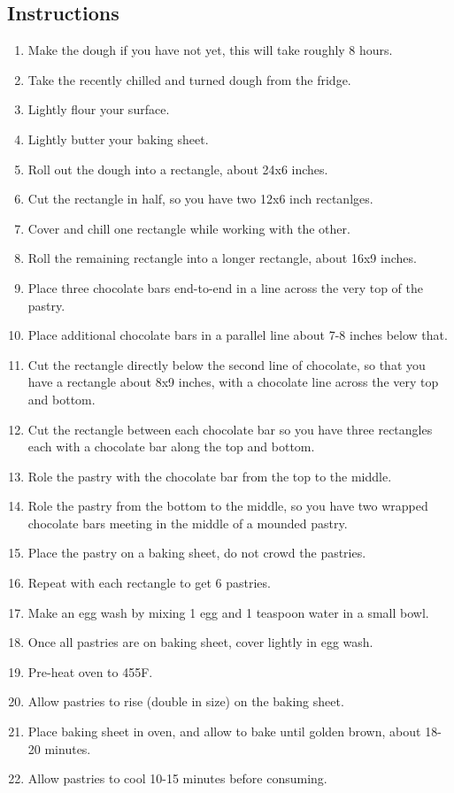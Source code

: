 \begin{multicols}{2}
\subsection*{Instructions}
\begin{enumerate}
    \item Make the  dough if you have not yet, this will take roughly 8 hours.
    \item Take the recently chilled and turned dough from the fridge.
    \item Lightly flour your surface.
    \item Lightly butter your baking sheet.
    \item Roll out the dough into a rectangle, about 24x6 inches.
    \item Cut the rectangle in half, so you have two 12x6 inch rectanlges.
    \item Cover and chill one rectangle while working with the other.
    \item Roll the remaining rectangle into a longer rectangle, about 16x9 inches.
    \item Place three chocolate bars end-to-end in a line across the very top of the pastry.
    \item Place additional chocolate bars in a parallel line about 7-8 inches below that.
    \item Cut the rectangle directly below the second line of chocolate, so that you have a rectangle about 8x9 inches, with a chocolate line across the very top and bottom.
    \item Cut the rectangle between each chocolate bar so you have three rectangles each with a chocolate bar along the top and bottom.
    \item Role the pastry with the chocolate bar from the top to the middle.
    \item Role the pastry from the bottom to the middle, so you have two wrapped chocolate bars meeting in the middle of a mounded pastry.
    \item Place the pastry on a baking sheet, do not crowd the pastries.
    \item Repeat with each rectangle to get 6 pastries.
    \item Make an egg wash by mixing 1 egg and 1 teaspoon water in a small bowl.
    \item Once all pastries are on baking sheet, cover lightly in egg wash.
    \item Pre-heat oven to 455F.
    \item Allow pastries to rise (double in size) on the baking sheet.
    \item Place baking sheet in oven, and allow to bake until golden brown, about 18-20 minutes.
    \item Allow pastries to cool 10-15 minutes before consuming.
    

\end{enumerate}
\end{multicols}
